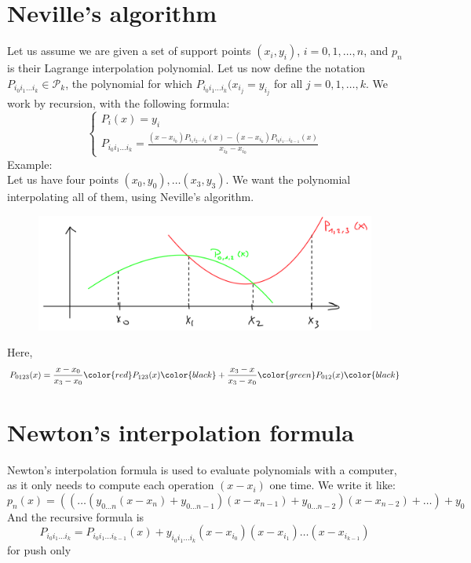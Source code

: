 \documentclass[12pt, openany]{report}
\begin{document}
\section{Neville's algorithm}
Let us assume we are given a set of support points \((x_i,y_i)\), \(i=0,1,\dots,n\), and \(p_n\) is their Lagrange interpolation polynomial. Let us now define the notation \(P_{i_0i_1\dots i_k}\in \mathcal{P}_k\), the polynomial for which \(P_{i_0i_1\dots i_k}(x_{i_j}=y_{i_j}\)  for all \(j=0,1,\dots,k\). We work by recursion, with the following formula:
\begin{equation}
    \begin{cases}
        P_i(x) = y_i\\
        P_{i_0i_1\dots i_k} = \frac{(x-x_{i_0})P_{i_1i_2\dots i_k}(x) - (x-x_{i_k})P_{i_0i_1\dots i_{k-1}}(x)}{x_{i_k}-x_{i_0}}
    \end{cases}
\end{equation}
Example:\\
Let us have four points \((x_0,y_0),\dots(x_3,y_3)\). We want the polynomial interpolating all of them, using Neville's algorithm. 
\begin{figure}[H]
    \centering
    \includegraphics[width=0.5\linewidth]{img/neville.png}
\end{figure}
Here, 
\begin{equation}
    P_{0123}(x) = \frac{x-x_0}{x_3-x_0}\color{red}P_{123}(x)\color{black}+\frac{x_3-x}{x_3-x_0}\color{green}P_{012}(x)\color{black}
\end{equation}
\section{Newton's interpolation formula}
Newton's interpolation formula is used to evaluate polynomials with a computer, as it only needs to compute each operation \((x-x_i)\) one time. We write it like:
\begin{equation}
    p_n(x) = \left(\left(\dots\left(y_{0\dots n}(x-x_n)+y_{0\dots n-1}\right)(x-x_{n-1})+y_{0\dots n-2}\right)(x-x_{n-2})+\dots\right) + y_0
\end{equation}
And the recursive formula is
\begin{equation}
    P_{i_0i_1\dots i_k}= P_{i_0i_1\dots i_{k-1}}(x) + y_{i_0i_1\dots i_k}(x-x_{i_0})(x-x_{i_1})\dots(x-x_{i_{k-1}})
\end{equation}
for push only
\end{document}
